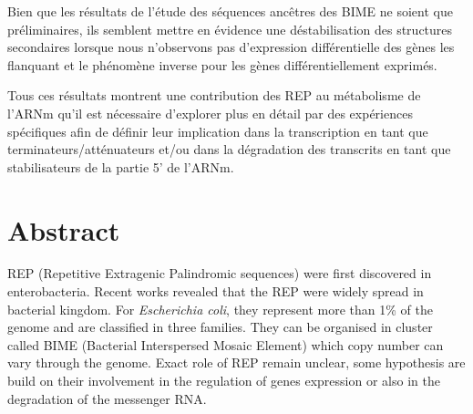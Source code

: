 \documentclass[12pt,a4paper]{report}
\begin{document}
Bien que les résultats de l'étude des séquences ancêtres des BIME ne soient que préliminaires, ils semblent mettre en évidence une déstabilisation des structures secondaires lorsque nous n'observons pas d'expression différentielle des gènes les flanquant et le phénomène inverse pour les gènes différentiellement exprimés.

Tous ces résultats montrent une contribution des REP au métabolisme de l'ARNm qu'il est nécessaire d'explorer plus en détail par des expériences spécifiques afin de définir leur implication dans la transcription en tant que terminateurs/atténuateurs et/ou dans la dégradation des transcrits en tant que stabilisateurs de la partie 5' de l'ARNm.



\chapter*{Abstract}
\thispagestyle{empty}

REP (Repetitive Extragenic Palindromic sequences) were first discovered in enterobacteria. Recent works revealed that the REP were widely spread in bacterial kingdom. For \textit{Escherichia coli}, they represent more than 1\% of the genome and are classified in three families. They can be organised in cluster called BIME (Bacterial Interspersed Mosaic Element) which copy number can vary through the genome. Exact role of REP remain unclear, some hypothesis are build on their involvement in the regulation of genes expression or also in the degradation of the messenger RNA.
\end{document}
